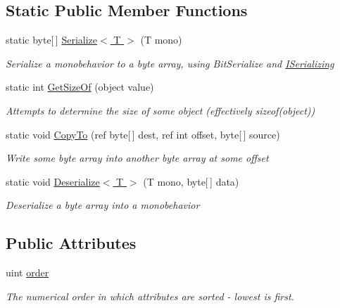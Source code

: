 \subsection*{Static Public Member Functions}
\begin{DoxyCompactItemize}
\item 
static byte\mbox{[}$\,$\mbox{]} \hyperlink{class_bit_serialize_attribute_a0d934db4b1bdd25dbb3ef5ba6536f6c3}{Serialize$<$ T $>$} (T mono)
\begin{DoxyCompactList}\small\item\em Serialize a monobehavior to a byte array, using Bit\-Serialize and \hyperlink{interface_i_serializing}{I\-Serializing} \end{DoxyCompactList}\item 
static int \hyperlink{class_bit_serialize_attribute_a45dcbeb6ab33c11f4d6cc4971bb4ba55}{Get\-Size\-Of} (object value)
\begin{DoxyCompactList}\small\item\em Attempts to determine the size of some object (effectively sizeof(object)) \end{DoxyCompactList}\item 
static void \hyperlink{class_bit_serialize_attribute_aca1cc7a1f81cfffcf0ae04058d2da2c9}{Copy\-To} (ref byte\mbox{[}$\,$\mbox{]} dest, ref int offset, byte\mbox{[}$\,$\mbox{]} source)
\begin{DoxyCompactList}\small\item\em Write some byte array into another byte array at some offset \end{DoxyCompactList}\item 
static void \hyperlink{class_bit_serialize_attribute_ae92d448c6f7bf6ffab890747e1737c65}{Deserialize$<$ T $>$} (T mono, byte\mbox{[}$\,$\mbox{]} data)
\begin{DoxyCompactList}\small\item\em Deserialize a byte array into a monobehavior \end{DoxyCompactList}\end{DoxyCompactItemize}
\subsection*{Public Attributes}
\begin{DoxyCompactItemize}
\item 
uint \hyperlink{class_bit_serialize_attribute_ad0a026f7b3c5c95879852db7a66a2726}{order}
\begin{DoxyCompactList}\small\item\em The numerical order in which attributes are sorted -\/ lowest is first. \end{DoxyCompactList}\end{DoxyCompactItemize}


